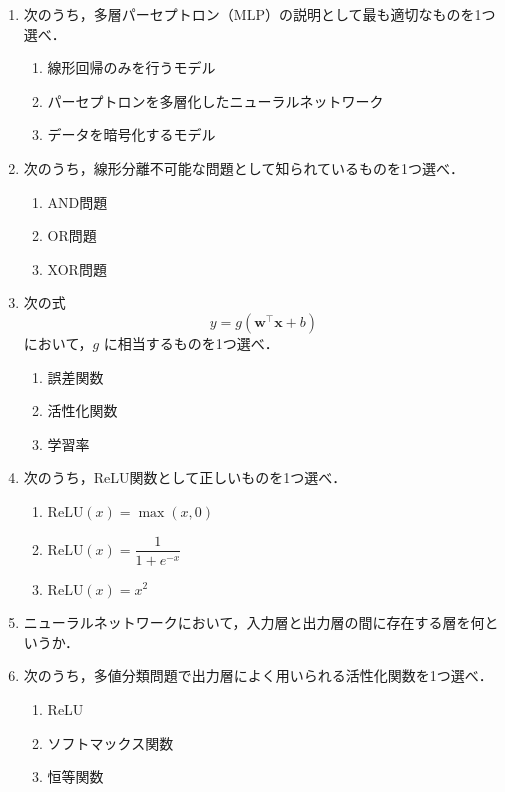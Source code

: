 \documentclass[uplatex,a4paper,12pt]{jsarticle}
\begin{document}
\begin{enumerate}

\item 次のうち，多層パーセプトロン（MLP）の説明として最も適切なものを1つ選べ．
\begin{enumerate}[label=(\alph*)]
\item 線形回帰のみを行うモデル
\item パーセプトロンを多層化したニューラルネットワーク
\item データを暗号化するモデル
\end{enumerate}

\item 次のうち，線形分離不可能な問題として知られているものを1つ選べ．
\begin{enumerate}[label=(\alph*)]
\item AND問題
\item OR問題
\item XOR問題
\end{enumerate}

\item 次の式
\[
y=g(\mathbf{w}^\top \mathbf{x}+b)
\]
において，$g$ に相当するものを1つ選べ．
\begin{enumerate}[label=(\alph*)]
\item 誤差関数
\item 活性化関数
\item 学習率
\end{enumerate}

\item 次のうち，ReLU関数として正しいものを1つ選べ．
\begin{enumerate}[label=(\alph*)]
\item $\mathrm{ReLU}(x)=\max(x,0)$
\item $\mathrm{ReLU}(x)=\dfrac{1}{1+e^{-x}}$
\item $\mathrm{ReLU}(x)=x^2$
\end{enumerate}

\item ニューラルネットワークにおいて，入力層と出力層の間に存在する層を何というか．

\item 次のうち，多値分類問題で出力層によく用いられる活性化関数を1つ選べ．
\begin{enumerate}[label=(\alph*)]
\item ReLU
\item ソフトマックス関数
\item 恒等関数
\end{enumerate}


\end{enumerate}
\end{document}
